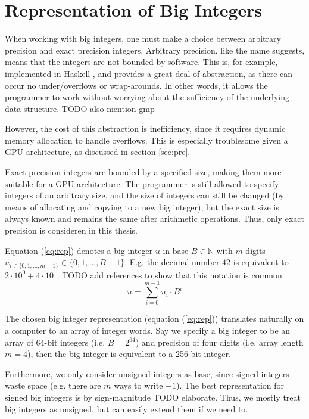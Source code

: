 \section{Representation of Big Integers}
\label{sec:big}
When working with big integers, one must make a choice between arbitrary
precision and exact precision integers. Arbitrary precision, like the name
suggests, means that the integers are not bounded by software. This is, for
example, implemented in Haskell \cite{marlow2010haskell}, and provides a great
deal of abstraction, as there can occur no under/overflows or wrap-arounds. In
other words, it allows the programmer to work without worrying about the
sufficiency of the underlying data structure. {\color{red} TODO also mention
  gmp}

However, the cost of this abstraction is inefficiency, since it requires dynamic
memory allocation to handle overflows. This is especially troublesome given a
GPU architecture, as discussed in section \ref{sec:pre}.

Exact precision integers are bounded by a specified size, making them more
suitable for a GPU architecture. The programmer is still allowed to specify
integers of an arbitrary size, and the size of integers can still be changed (by
means of allocating and copying to a new big integer), but the exact size is
always known and remains the same after arithmetic operations. Thus, only exact
precision is consideren in this thesis.

Equation (\ref{eq:rep}) denotes a big integer $u$ in base $B \in \mathbb{N}$ with
$m$ digits $u_{i\in \{0,1,\dots,m-1\}}\in\{0,1,\dots,B-1\}$. E.g. the decimal number
$42$ is equivalent to $2\cdot 10^0+4\cdot 10^1$. {\color{red} TODO add references to
  show that this notation is common}
\begin{equation}
\label{eq:rep}
u = \sum_{i=0}^{m-1}u_i\cdot B^{i}
\end{equation}

The chosen big integer representation (equation (\ref{eq:rep})) translates
naturally on a computer to an array of integer words. Say we specify a big
integer to be an array of 64-bit integers (i.e. $B = 2^{64}$) and precision of
four digits (i.e. array length $m = 4$), then the big integer is equivalent to a
256-bit integer.

Furthermore, we only consider unsigned integers as base, since signed integers
waste space (e.g. there are $m$ ways to write $-1$). The best representation for
signed big integers is by sign-magnitude {\color{red} TODO elaborate}. Thus, we
mostly treat big integers as unsigned, but can easily extend them if we need to.



